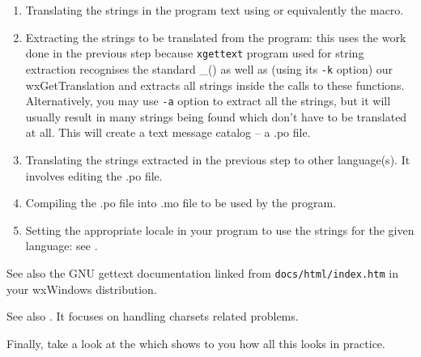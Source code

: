 \begin{enumerate}\itemsep=0pt
\item Translating the strings in the program text using 
 or equivalently the 
 macro.
\item Extracting the strings to be translated from the program: this uses the
work done in the previous step because {\tt xgettext} program used for string
extraction recognises the standard \_() as well as (using its {\tt -k} option)
our wxGetTranslation and extracts all strings inside the calls to these
functions. Alternatively, you may use {\tt -a} option to extract all the
strings, but it will usually result in many strings being found which don't
have to be translated at all. This will create a text message catalog -- a .po
file.
\item Translating the strings extracted in the previous step to other
language(s). It involves editing the .po file.
\item Compiling the .po file into .mo file to be used by the program.
\item Setting the appropriate locale in your program to use the strings for the
given language: see .
\end{enumerate}

See also the GNU gettext documentation linked from {\tt docs/html/index.htm} in
your wxWindows distribution.

See also .
It focuses on handling charsets related problems.

Finally, take a look at the  which shows
to you how all this looks in practice.

